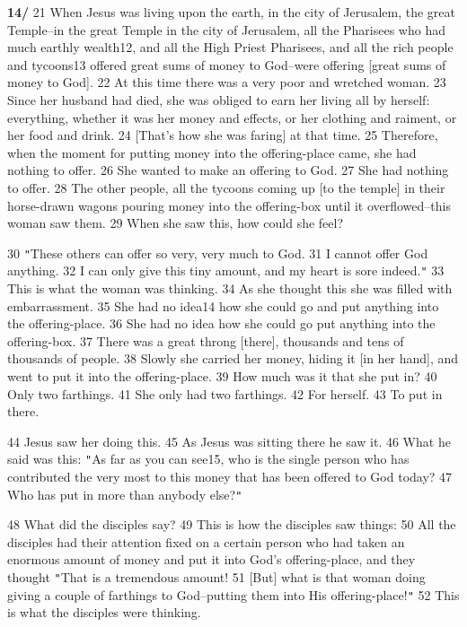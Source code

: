 \textbf{14/}  21 When Jesus was living upon the earth, in the city of Jerusalem,
the great Temple--in the great Temple in the city of Jerusalem, all the Pharisees
who had much earthly wealth12, and all the High Priest Pharisees, and all the rich
people and tycoons13 offered great sums of money to God--were offering [great sums
of money to God]. 22 At this time there was a very poor and wretched woman. 23
Since her husband had died, she was obliged to earn her living all by herself:
everything, whether it was her money and effects, or her clothing and raiment,
or her food and drink. 24 [That's how she was faring] at that time. 25 Therefore,
when the moment for putting money into the offering-place came, she had nothing
to offer. 26 She wanted to make an offering to God. 27 She had nothing to offer.
28 The other people, all the tycoons coming up [to the temple] in their horse-drawn
wagons pouring money into the offering-box until it overflowed--this woman saw
them. 29 When she saw this, how could she feel?

30 \texttt{"}These others can offer so very, very much to God. 31 I cannot offer
God anything. 32 I can only give this tiny amount, and my heart is sore indeed.\texttt{"}
33 This is what the woman was thinking. 34 As she thought this she was filled with
embarrassment. 35 She had no idea14 how she could go and put anything into the
offering-place. 36 She had no idea how she could go put anything into the offering-box.
37 There was a great throng [there], thousands and tens of thousands of people.
38 Slowly she carried her money, hiding it [in her hand], and went to put it into
the offering-place. 39 How much was it that she put in? 40 Only two farthings.
41 She only had two farthings. 42 For herself. 43 To put in there.

44 Jesus saw her doing this. 45 As Jesus was sitting there he saw it. 46 What he
said was this: \texttt{"}As far as you can see15, who is the single person who
has contributed the very most to this money that has been offered to God today?
47 Who has put in more than anybody else?\texttt{"}

48 What did the disciples say? 49 This is how the disciples saw things: 50 All
the disciples had their attention fixed on a certain person who had taken an enormous
amount of money and put it into God's offering-place, and they thought \texttt{"}That
is a tremendous amount! 51 [But] what is that woman doing giving a couple of farthings
to God--putting them into His offering-place!\texttt{"} 52 This is what the disciples
were thinking.


